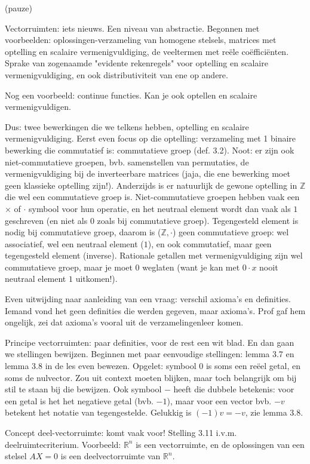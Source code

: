 \documentclass{article}
\begin{document}
(pauze) 

Vectorruimten: iets nieuws. Een niveau van abstractie. Begonnen met voorbeelden: oplossingen-verzameling van homogene stelsels, matrices met optelling en scalaire vermenigvuldiging, de veeltermen met re\"ele co\"effici\"enten. Sprake van zogenaamde "evidente rekenregels" voor optelling en scalaire vermenigvuldiging, en ook distributiviteit van ene op andere. 

Nog een voorbeeld: continue functies. Kan je ook optellen en scalaire vermenigvuldigen. 

Dus: twee bewerkingen die we telkens hebben, optelling en scalaire vermenigvuldiging. 
Eerst even focus op die optelling: verzameling met 1 binaire bewerking die commutatief is: commutatieve groep (def. 3.2). Noot: er zijn ook niet-commutatieve groepen, bvb. samenstellen van permutaties, de vermenigvuldiging bij de inverteerbare matrices (jaja, die ene bewerking moet geen klassieke optelling zijn!). Anderzijds is er natuurlijk de gewone optelling in $\mathbb{Z}$ die wel een commutatieve groep is. 
Niet-commutatieve groepen hebben vaak een $\times$ of $\cdot$ symbool voor hun operatie, en het neutraal element wordt dan vaak als $1$ geschreven (en niet als $0$ zoals bij commutatieve groep). Tegengesteld element is nodig bij commutatieve groep, daarom is ($\mathbb{Z}, \cdot$) geen commutatieve groep: wel associatief, wel een neutraal element ($1$), en ook commutatief, maar geen tegengesteld element (inverse). Rationale getallen met vermenigvuldiging zijn wel commutatieve groep, maar je moet 0 weglaten (want je kan met $0 \cdot x$ nooit neutraal element $1$ uitkomen!). 

Even uitwijding naar aanleiding van een vraag: verschil axioma's en definities. Iemand vond het geen definities die werden gegeven, maar axioma's. Prof gaf hem ongelijk, zei dat axioma's vooral uit de verzamelingenleer komen. 

Principe vectorruimten: paar definities, voor de rest een wit blad. En dan gaan we stellingen bewijzen. Beginnen met paar eenvoudige stellingen: lemma 3.7 en lemma 3.8 in de les even bewezen. 
Opgelet: symbool $0$ is soms een re\"eel getal, en soms de nulvector. Zou uit context moeten blijken, maar toch belangrijk om bij stil te staan bij die bewijzen. Ook symbool $-$ heeft die dubbele betekenis: voor een getal is het het negatieve getal (bvb. $-1$), maar voor een vector bvb. $-v$ betekent het notatie van tegengestelde. Gelukkig is $(-1)v = -v$, zie lemma 3.8. 

Concept deel-vectorruimte: komt vaak voor! Stelling 3.11 i.v.m. deelruimtecriterium. Voorbeeld: $\mathbb{R}^n$ is een vectorruimte, en de oplossingen van een stelsel $AX=0$ is een deelvectorruimte van $\mathbb{R}^n$. 
\end{document}
